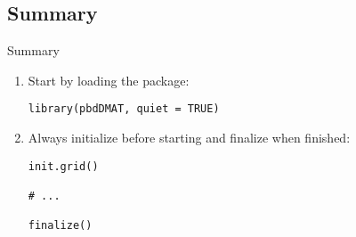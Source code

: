 \subsection{Summary}
\makesubcontentsslidessec


\begin{frame}[fragile]
  \begin{block}{Summary}\pause
    \begin{enumerate}
      \item Start by loading the package:
\vspace{-.4cm}
\begin{lstlisting}
library(pbdDMAT, quiet = TRUE)
\end{lstlisting}
      \item Always initialize before starting and finalize when finished:
\vspace{-.4cm}
\begin{lstlisting}
init.grid()

# ...

finalize()
\end{lstlisting}
    \end{enumerate}
  \end{block}
\end{frame}